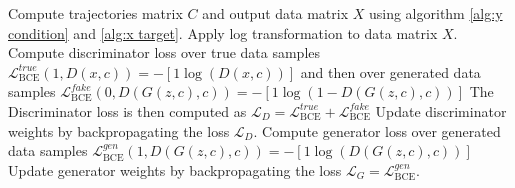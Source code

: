 \begin{algorithm}[H]
    \caption{Training process for CGAN model}
    \label{alg:cgan train}
    \begin{algorithmic}[1]

    \STATE Compute trajectories matrix $C$ and output data matrix $X$ using algorithm \ref{alg:y condition} and \ref{alg:x target}.
    \STATE Apply log transformation to data matrix $X$.
        \STATE Compute discriminator loss over true data samples $\mathcal{L}_{\text{BCE}}^{true}(1,D(x,c))
            = - \left[ 1 \log(D(x,c))\right]$ and then over generated data samples
            $\mathcal{L}_{\text{BCE}}^{fake}(0,D(G(z,c),c)) = - \left[  1\log(1 - D(G(z,c),c)) \right]$
        \STATE The Discriminator loss is then computed as $\mathcal{L}_D = \mathcal{L}_{\text{BCE}}^{true} + \mathcal{L}_{\text{BCE}}^{fake}$
        \STATE Update discriminator weights by backpropagating the loss $\mathcal{L}_D$.
        \STATE Compute generator loss over generated data samples
            $\mathcal{L}_{\text{BCE}}^{gen}(1,D(G(z,c),c)) = - \left[ 1 \log(D(G(z,c),c))\right]$   
        \STATE Update generator weights by backpropagating the loss $\mathcal{L}_G = \mathcal{L}_{\text{BCE}}^{gen}$.
    \ENDFOR
    \end{algorithmic}
\end{algorithm}

